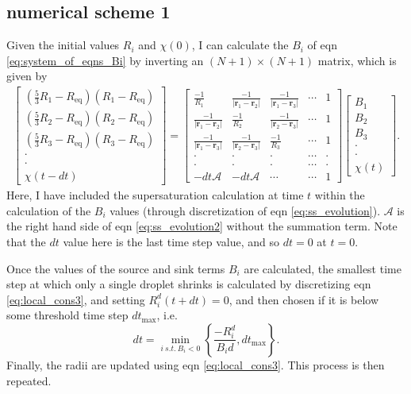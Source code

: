 \documentclass[12pt]{article}
\begin{document}
\subsection{numerical scheme 1}
Given the initial values $R_i$ and $\chi(0)$, I can calculate the $B_i$ of eqn \ref{eq:system_of_eqns_Bi} by inverting an $(N+1)\times (N+1)$ matrix, which is given by
\begin{align}\label{eq:matrix_Nside}
\begin{bmatrix}
\left(\frac{5}{3}R_1-R_{\text{eq}}\right)(R_1-R_{\text{eq}}) \\
\left(\frac{5}{3}R_2-R_{\text{eq}}\right)(R_2-R_{\text{eq}}) \\
\left(\frac{5}{3}R_3-R_{\text{eq}}\right)(R_3-R_{\text{eq}}) \\
\cdot \\
\cdot \\
\chi(t-dt) 
\end{bmatrix}=
\begin{bmatrix}
\frac{-1}{R_1} & \frac{-1}{|\bm{r}_1-\bm{r}_2|} & \frac{-1}{|\bm{r}_1-\bm{r}_3|} & \cdots & 1 \\
\frac{-1}{|\bm{r}_1-\bm{r}_2|} & \frac{-1}{R_2} & \frac{-1}{|\bm{r}_2-\bm{r}_3|} & \cdots & 1 \\
\frac{-1}{|\bm{r}_1-\bm{r}_3|} & \frac{-1}{|\bm{r}_2-\bm{r}_3|} & \frac{-1}{R_3} & \cdots & 1 \\
\cdot & \cdot &\cdot & \cdots & \cdot \\
\cdot & \cdot &\cdot & \cdots & \cdot \\
-dt\mathcal{A} & -dt\mathcal{A} & \cdots & \cdots & 1
\end{bmatrix}
\begin{bmatrix}
B_1 \\
B_2 \\
B_3 \\
\cdot \\
\cdot \\
\chi(t)
\end{bmatrix}.
\end{align}
Here, I have included the supersaturation calculation at time $t$ within the calculation of the $B_i$ values (through discretization of eqn \ref{eq:ss_evolution}). $\mathcal{A}$ is the right hand side of eqn \ref{eq:ss_evolution2} without the summation term. Note that the $dt$ value here is the last time step value, and so $dt=0$ at $t=0$.

Once the values of the source and sink terms $B_i$ are calculated, the smallest time step at which only a single droplet shrinks is calculated by discretizing eqn \ref{eq:local_cons3}, and setting $R_i^d(t+dt)=0$, and then chosen if it is below some threshold time step $dt_{\text{max}}$, i.e.
\begin{equation}\label{eq:min_step}
dt=\min_{i\:s.t.\: B_i<0}\left\{\frac{-R_i^d}{B_i d},dt_{\text{max}}\right\}.
\end{equation}
Finally, the radii are updated using eqn \ref{eq:local_cons3}. This process is then repeated.
\end{document}
